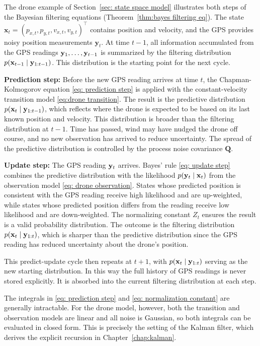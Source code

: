 \begin{example}
The drone example of Section~\ref{sec: state space model} illustrates both steps of the Bayesian filtering equations  (Theorem~\ref{thm:bayes filtering eq}). The state  $\mathbf{x}_{t} = (p_{x,t}, p_{y,t}, v_{x,t}, v_{y,t})^{\top}$ contains position and velocity, and the GPS provides noisy position measurements $\mathbf{y}_{t}$. At time $t-1$, all information accumulated from the GPS readings $\mathbf{y}_{1}, \ldots, \mathbf{y}_{t-1}$ is summarized by the filtering distribution $p(\mathbf{x}_{t-1} \mid \mathbf{y}_{1:t-1})$. This distribution is the starting point for the next cycle.

\textbf{Prediction step:}
Before the new GPS reading arrives at time $t$, the Chapman-Kolmogorov equation \eqref{eq: prediction step} is applied with the constant-velocity transition model \eqref{eq:drone transition}. The result is the predictive distribution $p(\mathbf{x}_{t} \mid \mathbf{y}_{1:t-1})$, which reflects where the drone is expected to be based on its last known position and velocity. This distribution is broader than the filtering distribution at $t-1$. Time has passed, wind may have nudged the drone off course, and no new observation has arrived to reduce uncertainty. The spread of the predictive distribution is controlled by the process noise covariance $\mathbf{Q}$.

\textbf{Update step:}
The GPS reading $\mathbf{y}_{t}$ arrives. Bayes' rule \eqref{eq: update step} combines the predictive distribution with the likelihood $p(\mathbf{y}_{t} \mid \mathbf{x}_{t})$ from the observation model \eqref{eq: drone observation}. States whose predicted position is consistent with the GPS reading receive high likelihood and are up-weighted, while states whose predicted position differs from the reading receive low likelihood and are down-weighted. The normalizing constant $Z_{t}$ ensures the result is a valid probability distribution. The outcome is the filtering distribution $p(\mathbf{x}_{t} \mid \mathbf{y}_{1:t})$, which is sharper than the predictive distribution since the GPS reading has reduced uncertainty about the drone's position.

This predict-update cycle then repeats at $t+1$, with $p(\mathbf{x}_{t} \mid \mathbf{y}_{1:t})$ serving as the new starting distribution. In this way the full history of GPS readings is never stored explicitly. It is absorbed into the current filtering distribution at each step.

The integrals in \eqref{eq: prediction step} and \eqref{eq: normalization constant} are generally intractable. For the drone model, however, both the transition and observation models are linear and all noise is Gaussian, so both integrals can be evaluated in closed form. This is precisely the setting of the Kalman filter, which derives the explicit recursion in Chapter~\ref{chap:kalman}.
\end{example}


